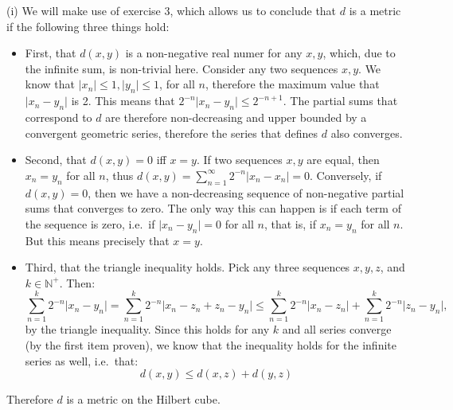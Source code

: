 \begin{solution}
    
    (i) We will make use of exercise 3, which allows us to conclude that $d$ is a metric if the following three things hold:
    \begin{itemize}
        \item First, that $d(x, y)$ is a non-negative real numer for any $x, y$, which, due to the infinite sum, is non-trivial here. 
        Consider any two sequences $x, y$. We know that $\lvert x_n \rvert \leq 1, \lvert y_n \rvert \leq 1$, for all $n$, therefore the maximum value that $\lvert x_n - y_n \rvert$ is 2.
        This means that $2^{-n} \lvert x_n - y_n \rvert \leq 2^{-n+1}$.
        The partial sums that correspond to $d$ are therefore non-decreasing and upper bounded by a convergent geometric series, therefore the series that defines $d$ also converges.
        \item Second, that $d(x, y) = 0$ iff $x = y$.
        If two sequences $x, y$ are equal, then $x_n = y_n$ for all $n$, thus $d(x, y) = \sum_{n=1}^{\infty} 2^{-n} \lvert x_n - x_n \rvert = 0$.
        Conversely, if $d(x, y) = 0$, then we have a non-decreasing sequence of non-negative partial sums that converges to zero.
        The only way this can happen is if each term of the sequence is zero, i.e.\ if $\lvert x_n - y_n \rvert = 0$ for all $n$, that is, if $x_n = y_n$ for all $n$.
        But this means precisely that $x = y$.
        \item Third, that the triangle inequality holds.
        Pick any three sequences $x, y, z$, and $k \in \mathbb{N}^+$.
        Then:
        $$\sum_{n = 1}^{k} 2^{-n} \lvert x_n - y_n \rvert = \sum_{n=1}^{k} 2^{-n} \lvert x_n - z_n + z_n - y_n \rvert \leq \sum_{n=1}^{k} 2^{-n} \lvert x_n - z_n \rvert + \sum_{n=1}^{k} 2^{-n} \lvert z_n - y_n \rvert,$$
        by the triangle inequality.
        Since this holds for any $k$ and all series converge (by the first item proven), we know that the inequality holds for the infinite series as well, i.e.\ that:
        $$d(x, y) \leq d(x, z) + d(y, z)$$
    \end{itemize}
    Therefore $d$ is a metric on the Hilbert cube.


\end{solution}
